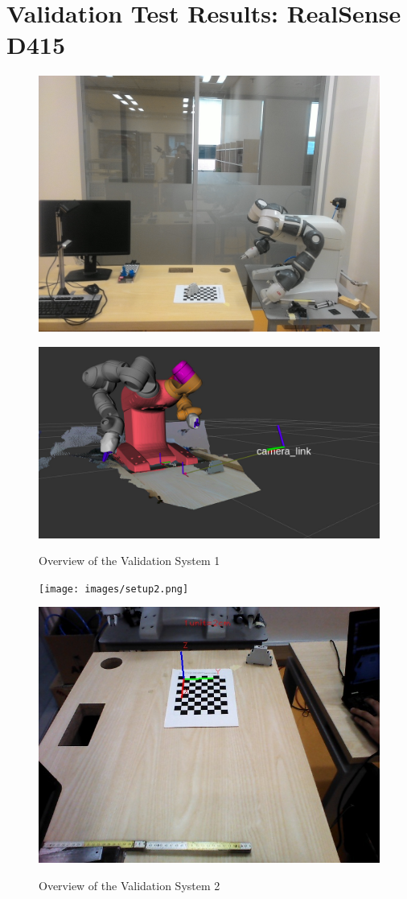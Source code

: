 \appendix
\chapter*{Validation Test Results: RealSense D415}
\label{chap:rsd415}


\begin{figure}[htp]
\begin{center}
{
  \includegraphics[clip,width=0.6\columnwidth]{images/setup1.jpg}
}
\end{center}
\begin{center}
{
  \includegraphics[clip,width=0.6\columnwidth]{images/system1.jpg}
}
\end{center}
\caption{Overview of the Validation System 1}
\label{setupsystem1}
\end{figure}




\begin{figure}[htp]
\begin{center}
{
  \texttt{[image: images/setup2.png]}
}
\end{center}
\begin{center}
{
  \includegraphics[clip,width=0.6\columnwidth]{images/setup3.jpg}
}
\end{center}
\caption{Overview of the Validation System 2}
\label{setupsystem2}
\end{figure}



